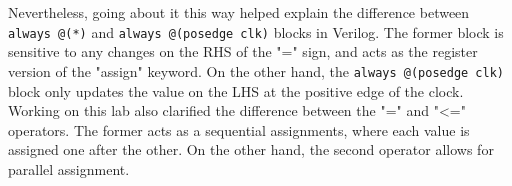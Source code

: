 \documentclass[twocolumn]{article}
\newcommand{\cc}[1]{\texttt{#1}}
\begin{document}
Nevertheless, going about it this way helped explain the difference between \cc{always @(*)} and \cc{always @(posedge clk)} blocks in Verilog. The former block is sensitive to any changes on the RHS of the "=" sign, and acts as the register version of the "assign" keyword. On the other hand, the \cc{always @(posedge clk)} block only updates the value on the LHS at the positive edge of the clock. \\

Working on this lab also clarified the difference between the "=" and "<=" operators. The former acts as a sequential assignments, where each value is assigned one after the other. On the other hand, the second operator allows for parallel assignment. \\


\printbibliography
\end{document}
